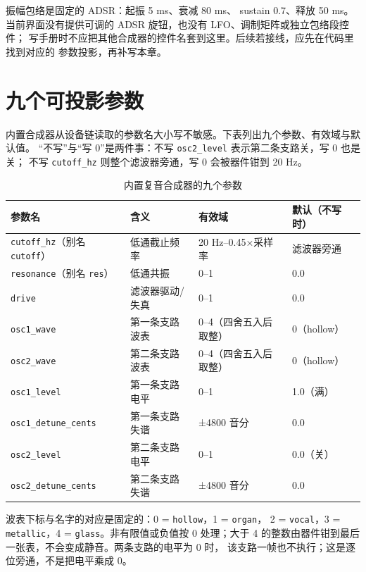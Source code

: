 振幅包络是固定的 ADSR：起振 5 ms、衰减 80 ms、 sustain 0.7、释放 50 ms。
当前界面没有提供可调的 ADSR 旋钮，也没有 LFO、调制矩阵或独立包络段控件；
写手册时不应把其他合成器的控件名套到这里。后续若接线，应先在代码里找到对应的
参数投影，再补写本章。

\section{九个可投影参数}

内置合成器从设备链读取的参数名大小写不敏感。下表列出九个参数、有效域与默认值。
“不写”与“写 0”是两件事：不写 \texttt{osc2\_level} 表示第二条支路关，写 0 也是关；
不写 \texttt{cutoff\_hz} 则整个滤波器旁通，写 0 会被器件钳到 20 Hz。

\begin{table}[htbp]
\centering
\small
\begin{tabular}{@{}llll@{}}
\hline
参数名 & 含义 & 有效域 & 默认（不写时） \\
\hline
\texttt{cutoff\_hz}（别名 \texttt{cutoff}） & 低通截止频率 & 20 Hz–0.45×采样率 & 滤波器旁通 \\
\texttt{resonance}（别名 \texttt{res}） & 低通共振 & 0–1 & 0.0 \\
\texttt{drive} & 滤波器驱动/失真 & 0–1 & 0.0 \\
\texttt{osc1\_wave} & 第一条支路波表 & 0–4（四舍五入后取整） & 0（hollow） \\
\texttt{osc2\_wave} & 第二条支路波表 & 0–4（四舍五入后取整） & 0（hollow） \\
\texttt{osc1\_level} & 第一条支路电平 & 0–1 & 1.0（满） \\
\texttt{osc1\_detune\_cents} & 第一条支路失谐 & ±4800 音分 & 0.0 \\
\texttt{osc2\_level} & 第二条支路电平 & 0–1 & 0.0（关） \\
\texttt{osc2\_detune\_cents} & 第二条支路失谐 & ±4800 音分 & 0.0 \\
\hline
\end{tabular}
\caption{内置复音合成器的九个参数}
\label{tab:synth-params}
\end{table}


波表下标与名字的对应是固定的：0 = \texttt{hollow}，1 = \texttt{organ}，
2 = \texttt{vocal}，3 = \texttt{metallic}，4 = \texttt{glass}。非有限值或负值按 0
处理；大于 4 的整数由器件钳到最后一张表，不会变成静音。两条支路的电平为 0 时，
该支路一帧也不执行；这是逐位旁通，不是把电平乘成 0。

